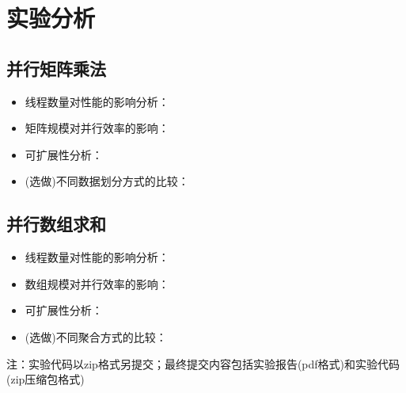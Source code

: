 \documentclass{SYSUReport}
\begin{document}
\section{实验分析}
\subsection{并行矩阵乘法}
\begin{itemize}
    \item 线程数量对性能的影响分析：
    \item 矩阵规模对并行效率的影响：
    \item 可扩展性分析：
    \item (选做)不同数据划分方式的比较：
\end{itemize}

\subsection{并行数组求和}
\begin{itemize}
    \item 线程数量对性能的影响分析：
    \item 数组规模对并行效率的影响：
    \item 可扩展性分析：
    \item (选做)不同聚合方式的比较：
\end{itemize}
注：实验代码以zip格式另提交；最终提交内容包括实验报告(pdf格式)和实验代码(zip压缩包格式)
\end{document}
